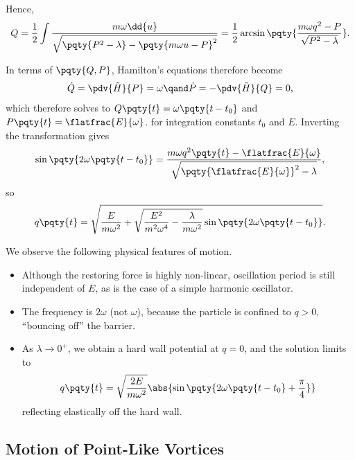 \begin{example}
    Hence,
    \begin{equation}
        Q = \frac{1}{2} \int \frac{m \omega \dd{u}}{\sqrt{\pqty{P^2 - \lambda} - 
        \pqty{m \omega u - P}^2}} = \frac{1}{2} \arcsin\pqty{\frac{m \omega q^2 - P}{\sqrt{P^2 - \lambda}}}.
    \end{equation}

    In terms of \(\pqty{Q, P}\), Hamilton's equations therefore become
    \begin{equation}
        \dot{Q} = \pdv{\tilde{H}}{P} = \omega \qand \dot{P} = - \pdv{\tilde{H}}{Q} = 0,
    \end{equation}
    which therefore solves to \(Q\pqty{t} = \omega \pqty{t - t_0}\) and \(P\pqty{t} = \flatfrac{E}{\omega}\). for integration constants \(t_0\) and \(E\). Inverting the transformation gives
    \begin{equation}
        \sin\pqty{2 \omega \pqty{t - t_0}} = \frac{m \omega q^2 \pqty{t} - \flatfrac{E}{\omega}}{\sqrt{\pqty{\flatfrac{E}{\omega}}^2 - \lambda}},
    \end{equation}
    so
    \begin{equation}
        q\pqty{t} = \sqrt{\frac{E}{m \omega^2} + \sqrt{\frac{E^2}{m^2 \omega^4} - \frac{\lambda}{m \omega^2}} \sin\pqty{2 \omega \pqty{t - t_0}}}.
    \end{equation}

    We observe the following physical features of motion.

    \begin{itemize}
        \item Although the restoring force is highly non-linear, oscillation period is still independent of \(E\), as is the case of a simple harmonic oscillator.
        \item The frequency is \(2 \omega\) (not \(\omega\)), because the particle is confined to \(q > 0\), ``bouncing off'' the barrier.
        \item As \(\lambda \to 0^+\), we obtain a hard wall potential at \(q = 0\), and the solution limits to
        \begin{equation}
            q\pqty{t} = \sqrt{\frac{2E}{m \omega^2}} \abs{\sin \pqty{2 \omega \pqty{t - t_0} + \frac{\pi}{4}}}
        \end{equation}
        reflecting elastically off the hard wall.
    \end{itemize}
\end{example}

\subsection{Motion of Point-Like Vortices}

